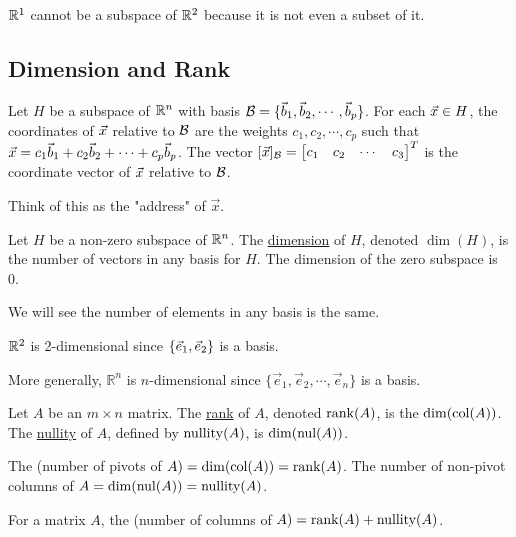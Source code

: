 \documentclass[10pt,a4paper]{article}
\begin{document}
$\mathbb{R}^1$ cannot be a subspace of $\mathbb{R}^2$ because it is not even a subset of it.

\subsection{Dimension and Rank}

\begin{definition}
	Let $H$ be a subspace of $\mathbb{R}^n$ with basis $\mathcal{B}=\{\vec{b}_1,\vec{b}_2,\cdots,\vec{b}_p\}$. For each $\vec{x}\in H$, the coordinates of $\vec{x}$ relative to $\mathcal{B}$ are the weights $c_1,c_2,\cdots,c_p$ such that $\vec{x} = c_1 \vec{b}_1+c_2 \vec{b}_2 + \cdots + c_p \vec{b}_p$. The vector $[\vec{x}]_{\mathcal{B}} = \begin{bmatrix}c_1 &c_2 &\cdots &c_3\end{bmatrix}^T$ is the coordinate vector of $\vec{x}$ relative to $\mathcal{B}$.
\end{definition}
\begin{remark}Think of this as the "address" of $\vec{x}$.\end{remark}

\begin{definition}
	Let $H$ be a non-zero subspace of $\mathbb{R}^n$. The \underline{dimension} of $H$, denoted $\dim(H)$, is the number of vectors in any basis for $H$. The dimension of the zero subspace is 0.
\end{definition}
\begin{remark}We will see the number of elements in any basis is the same.\end{remark}
\begin{example}
	$\mathbb{R}^2$ is 2-dimensional since $\{\vec{e}_1,\vec{e}_2\}$ is a basis.
\end{example}
More generally, $\mathbb{R}^n$ is $n$-dimensional since $\{\vec{e}_1,\vec{e}_2,\cdots,\vec{e}_n\}$ is a basis.

\begin{definition}
	Let $A$ be an $m\times n$ matrix. The \underline{rank} of $A$, denoted $\text{rank}(A)$, is the $\dim(\text{col}(A))$. The \underline{nullity} of $A$, defined by $\text{nullity}(A)$, is $\dim(\text{nul}(A))$.
\end{definition}
\begin{note}
	The (number of pivots of $A) = \dim(\text{col}(A)) = \text{rank}(A)$. The number of non-pivot columns of $A = \dim(\text{nul}(A)) = \text{nullity}(A)$. 
\end{note}

\begin{theorem}
	For a matrix $A$, the (number of columns of $A) = \text{rank}(A)+\text{nullity}(A)$.
\end{theorem}
\end{document}
